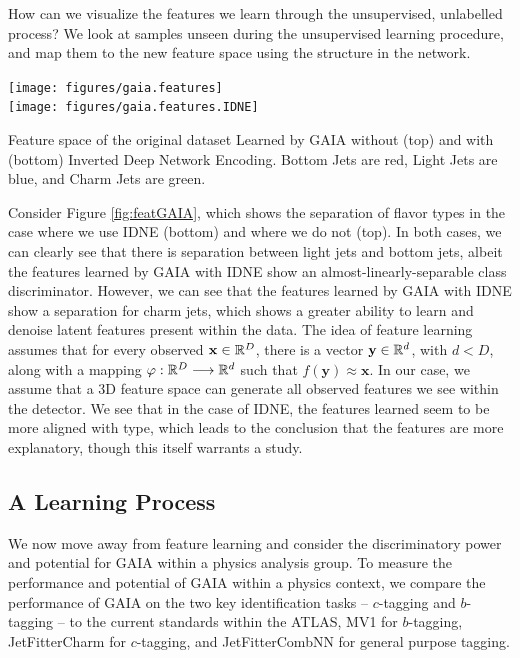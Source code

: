 How can we visualize the features we learn through the unsupervised, unlabelled process? We look at samples unseen during the unsupervised learning procedure, and map them to the new feature space using the structure in the network. 

\begin{FPfigure}
\texttt{[image: figures/gaia.features]}\\
\texttt{[image: figures/gaia.features.IDNE]}
\caption[The ATLAS detector]{Feature space of the original dataset Learned by GAIA without (top) and with (bottom) Inverted Deep Network Encoding. Bottom Jets are red, Light Jets are blue, and Charm Jets are green.
\label{fig:featGAIA}}
\end{FPfigure}


Consider Figure \ref{fig:featGAIA}, which shows the separation of flavor types in the case where we use IDNE (bottom) and where we do not (top). In both cases, we can clearly see that there is separation between light jets and bottom jets, albeit the features learned by GAIA with IDNE show an almost-linearly-separable class discriminator. However, we can see that the features learned by GAIA with IDNE show a separation for charm jets, which shows a greater ability to learn and denoise latent features present within the data. The idea of feature learning assumes that for every observed  $\mathbf{x}\in\mathbb{R}^D$, there is a vector $\mathbf{y}\in\mathbb{R}^d$, with $d<D$, along with a mapping $\varphi:\mathbb{R}^D\longrightarrow\mathbb{R}^d$ such that $f(\mathbf{y}) \approx \mathbf{x}$. In our case, we assume that a 3D feature space can generate all observed features we see within the detector. We see that in the case of IDNE, the features learned seem to be more aligned with type, which leads to the conclusion that the features are more explanatory, though this itself warrants a study.

\subsection{A Learning Process}

We now move away from feature learning and consider the discriminatory power and potential for GAIA within a physics analysis group. To measure the performance and potential of GAIA within a physics context, we compare the performance of GAIA on the two key identification tasks -- $c$-tagging and $b$-tagging -- to the current standards within the ATLAS, MV1 for $b$-tagging, JetFitterCharm for $c$-tagging, and JetFitterCombNN for general purpose tagging.

